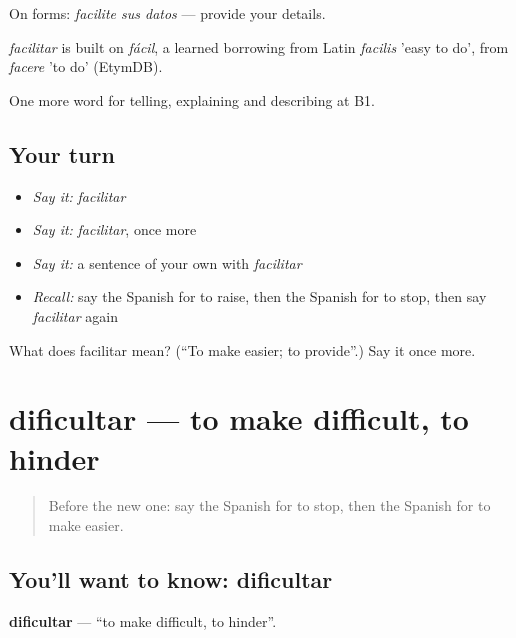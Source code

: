 On forms: \emph{facilite sus datos} — provide your details.

\begin{cousinweb}
\emph{facilitar} is built on \emph{fácil}, a learned borrowing from Latin \emph{facilis} 'easy to do', from \emph{facere} 'to do' (EtymDB).
\end{cousinweb}

\begin{grammarlens}[title={What you've built}]
One more word for telling, explaining and describing at B1.
\end{grammarlens}

\subsection*{Your turn}
\begin{itemize}
\raggedright
  \item \emph{Say it:} \emph{facilitar}
  \item \emph{Say it:} \emph{facilitar}, once more
  \item \emph{Say it:} a sentence of your own with \emph{facilitar}
  \item \emph{Recall:} say the Spanish for to raise, then the Spanish for to stop, then say \emph{facilitar} again
\end{itemize}

\begin{tcolorbox}[breakable,colback=teal!4,colframe=teal!35!black,title={Before you move on}]
What does facilitar mean? (\textquotedblleft{}To make easier; to provide\textquotedblright{}.) Say it once more.
\end{tcolorbox}
\section[dificultar]{dificultar — to make difficult, to hinder}

\label{lesson:ES-C621-dificultar}



\begin{quote}
Before the new one: say the Spanish for to stop, then the Spanish for to make easier.
\end{quote}

\subsection*{You'll want to know: dificultar}
\textbf{dificultar} — \textquotedblleft{}to make difficult, to hinder\textquotedblright{}.

